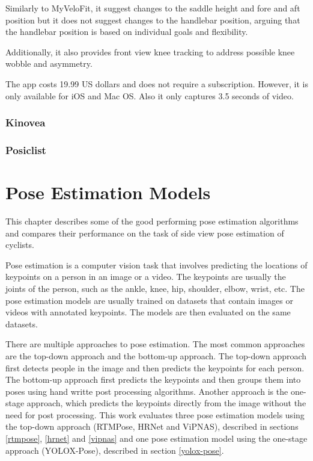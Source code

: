 Similarly to MyVeloFit, it suggest changes to the saddle height and fore and aft position but it does not suggest changes to the handlebar position, arguing that the handlebar position is based on individual goals and flexibility.

Additionally, it also provides front view knee tracking to address possible knee wobble and asymmetry.

The app costs 19.99 US dollars and does not require a subscription. However, it is only available for iOS and Mac OS. Also it only captures 3.5 seconds of video.


\subsection{Kinovea}


\subsection{Posiclist}




\chapter{Pose Estimation Models}

This chapter describes some of the good performing pose estimation algorithms and compares their performance on the task of side view pose estimation of cyclists.

Pose estimation is a computer vision task that involves predicting the locations of keypoints on a person in an image or a video. The keypoints are usually the joints of the person, such as the ankle, knee, hip, shoulder, elbow, wrist, etc. The pose estimation models are usually trained on datasets that contain images or videos with annotated keypoints. The models are then evaluated on the same datasets.

There are multiple approaches to pose estimation. The most common approaches are the top-down approach and the bottom-up approach. The top-down approach first detects people in the image and then predicts the keypoints for each person. The bottom-up approach first predicts the keypoints and then groups them into poses using hand writte post processing algorithms. Another approach is the one-stage approach, which predicts the keypoints directly from the image without the need for post processing. This work evaluates three pose estimation models using the top-down approach (RTMPose, HRNet and ViPNAS), described in sections \ref{rtmpose}, \ref{hrnet} and \ref{vipnas} and one pose estimation model using the one-stage approach (YOLOX-Pose), described in section \ref{yolox-pose}.

